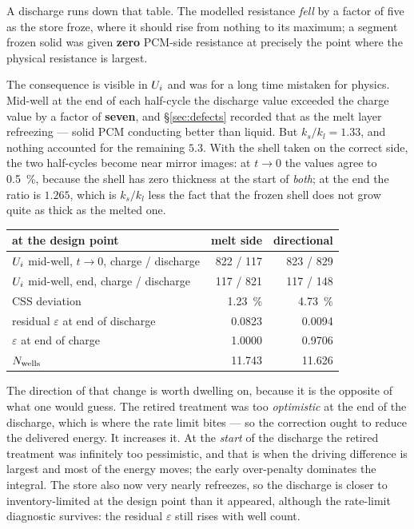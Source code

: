 \noindent
A discharge runs down that table. The modelled resistance \emph{fell} by a
factor of five as the store froze, where it should rise from nothing to its
maximum; a segment frozen solid was given \textbf{zero} PCM-side resistance at
precisely the point where the physical resistance is largest.

The consequence is visible in $U_{i}$ and was for a long time mistaken for
physics. Mid-well at the end of each half-cycle the discharge value exceeded the
charge value by a factor of \textbf{seven}, and \S\ref{sec:defects} recorded
that as the melt layer refreezing --- solid PCM conducting better than liquid.
But $k_{s}/k_{l}=1.33$, and nothing accounted for the remaining $5.3$. With the
shell taken on the correct side, the two half-cycles become near mirror images:
at $t\to0$ the values agree to \SI{0.5}{\percent}, because the shell has zero
thickness at the start of \emph{both}; at the end the ratio is $1.265$, which is
$k_{s}/k_{l}$ less the fact that the frozen shell does not grow quite as thick
as the melted one.

\begin{center}
\begin{tabular}{@{}l r r@{}}
\toprule
at the design point & melt side & directional \\
\midrule
$U_{i}$ mid-well, $t\to0$, charge / discharge & 822 / 117 & 823 / 829 \\
$U_{i}$ mid-well, end, charge / discharge     & 117 / 821 & 117 / 148 \\
CSS deviation                                & \SI{+1.23}{\percent} & \SI{+4.73}{\percent} \\
residual $\varepsilon$ at end of discharge   & 0.0823 & 0.0094 \\
$\varepsilon$ at end of charge               & 1.0000 & 0.9706 \\
$N_{\mathrm{wells}}$                                    & 11.743 & 11.626 \\
\bottomrule
\end{tabular}
\end{center}

\noindent
The direction of that change is worth dwelling on, because it is the opposite of
what one would guess. The retired treatment was too \emph{optimistic} at the end
of the discharge, which is where the rate limit bites --- so the correction
ought to reduce the delivered energy. It increases it. At the \emph{start} of
the discharge the retired treatment was infinitely too pessimistic, and that is
when the driving difference is largest and most of the energy moves; the early
over-penalty dominates the integral. The store also now very nearly refreezes,
so the discharge is closer to inventory-limited at the design point than it
appeared, although the rate-limit diagnostic survives: the residual
$\varepsilon$ still rises with well count.

